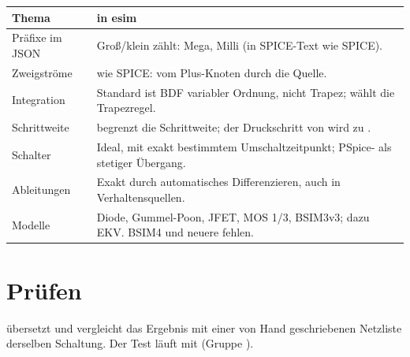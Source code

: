 \begin{center}
\begin{tabularx}{\textwidth}{@{}P{4.2cm}L@{}}
  \toprule
  Thema & in esim \\
  \midrule
  Präfixe im JSON & Groß/klein zählt:  Mega,  Milli (in SPICE-Text wie SPICE). \\
  Zweigströme &  wie SPICE: vom Plus-Knoten durch die Quelle. \\
  Integration & Standard ist BDF variabler Ordnung, nicht Trapez;  wählt die Trapezregel. \\
  Schrittweite &  begrenzt die Schrittweite; der Druckschritt von  wird zu . \\
  Schalter & Ideal, mit exakt bestimmtem Umschaltzeitpunkt; PSpice- als stetiger Übergang. \\
  Ableitungen & Exakt durch automatisches Differenzieren, auch in Verhaltensquellen. \\
  Modelle & Diode, Gummel-Poon, JFET, MOS 1/3, BSIM3v3; dazu EKV. BSIM4 und neuere fehlen. \\
  \bottomrule
\end{tabularx}
\end{center}

\section{Prüfen}

 übersetzt
 und vergleicht das Ergebnis mit einer
von Hand geschriebenen Netzliste derselben Schaltung. Der Test läuft mit
 (Gruppe ).
